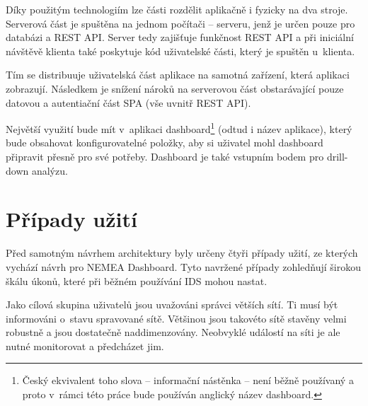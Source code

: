 Díky použitým technologiím lze části rozdělit aplikačně i fyzicky na dva stroje. Serverová část je spuštěna na jednom počítači -- serveru, jenž je určen pouze pro databázi a REST API. Server tedy zajišťuje funkčnost REST API a při iniciální návštěvě klienta také poskytuje kód uživatelské části, který je spuštěn u~klienta.

Tím se distribuuje uživatelská část aplikace na samotná zařízení, která aplikaci zobrazují. Následkem je snížení nároků na serverovou část obstarávající pouze datovou a autentiační část SPA (vše uvnitř REST API).

Největší využití bude mít v~aplikaci dashboard\footnote{Český ekvivalent toho slova -- informační nástěnka -- není běžně používaný a proto v~rámci této práce bude používán anglický název dashboard.} (odtud i název aplikace), který bude obsahovat konfigurovatelné položky, aby si uživatel mohl dashboard připravit přesně pro své potřeby. Dashboard je také vstupním bodem pro drill-down analýzu.

\section{Případy užití}
Před samotným návrhem architektury byly určeny čtyři případy užití, ze kterých vychází návrh pro NEMEA Dashboard. Tyto navržené případy zohledňují širokou škálu úkonů, které při běžném používání IDS mohou nastat.

Jako cílová skupina uživatelů jsou uvažováni správci větších sítí. Ti musí být informováni o~stavu spravované sítě. Většinou jsou takovéto sítě stavěny velmi robustně a jsou dostatečně naddimenzovány. Neobvyklé událostí na síti je ale nutné monitorovat a předcházet jim.

\label{sec:aud}

